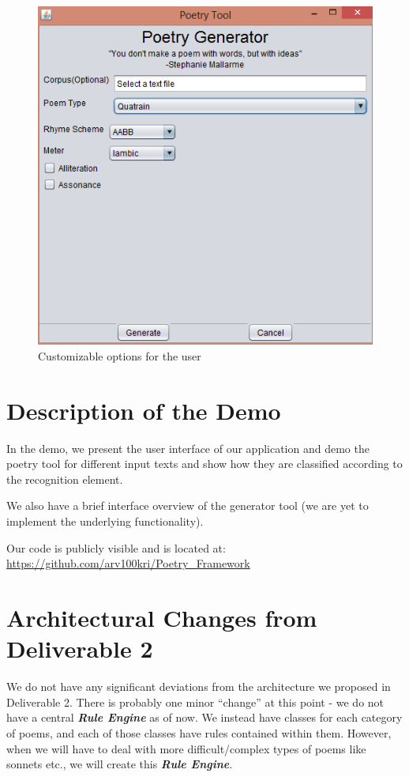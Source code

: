 \documentclass[10pt, letter]{article}
\begin{document}
\begin{figure}[ht]
  \centering
    \includegraphics[scale=0.5]{Images/screen4}
    \caption{Customizable options for the user}
  \label{screen5}
\end{figure}



\section*{Description of the Demo}
In the demo, we present the user interface of our application and demo the poetry tool for different input texts and show how they are classified according to the recognition element.

We also have a brief interface overview of the generator tool (we are yet to implement the underlying functionality).

Our code is publicly visible and is located at: \url{https://github.com/arv100kri/Poetry_Framework}

\section*{Architectural Changes from Deliverable 2}

We do not have any significant deviations from the architecture we proposed in Deliverable 2. There is probably one minor “change” at this point - we do not have a central \textbf{\textit{Rule Engine}} as of now. We instead have classes for each category of poems, and each of those classes have rules contained within them. However, when we will have to deal with more difficult/complex types of poems like sonnets etc., we will create this \textbf{\textit{Rule Engine}}.
\end{document}

